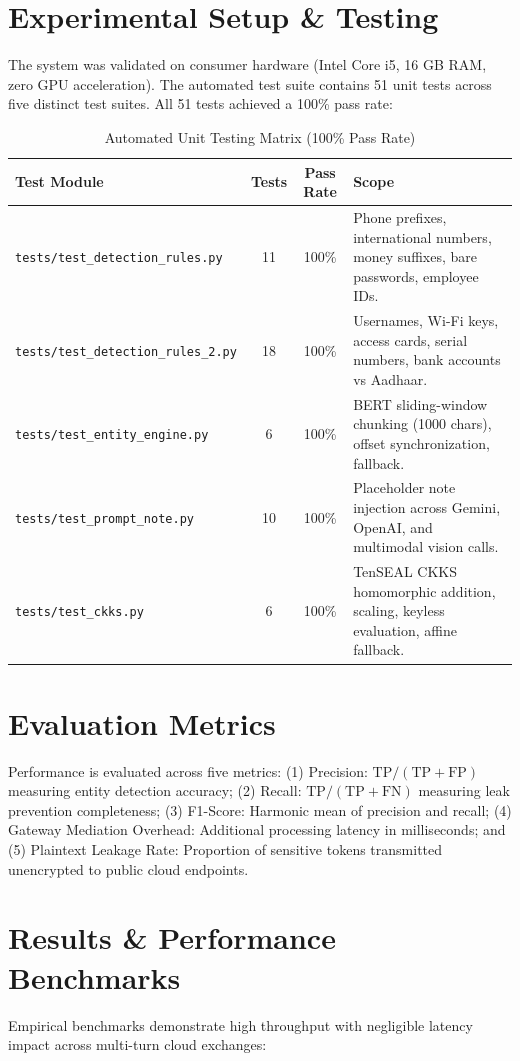 \documentclass[10pt,a4paper]{article}
\begin{document}
\section{Experimental Setup \& Testing}
The system was validated on consumer hardware (Intel Core i5, 16 GB RAM, zero GPU acceleration). The automated test suite contains 51 unit tests across five distinct test suites. All 51 tests achieved a 100\% pass rate:

\begin{table}[h]
\centering
\small
\begin{tabular}{p{}ccp{}}
\toprule
\textbf{Test Module} & \textbf{Tests} & \textbf{Pass Rate} & \textbf{Scope} \\
\midrule
\texttt{tests/test\_detection\_rules.py} & 11 & 100\% & Phone prefixes, international numbers, money suffixes, bare passwords, employee IDs. \\
\texttt{tests/test\_detection\_rules\_2.py} & 18 & 100\% & Usernames, Wi-Fi keys, access cards, serial numbers, bank accounts vs Aadhaar. \\
\texttt{tests/test\_entity\_engine.py} & 6 & 100\% & BERT sliding-window chunking (1000 chars), offset synchronization, fallback. \\
\texttt{tests/test\_prompt\_note.py} & 10 & 100\% & Placeholder note injection across Gemini, OpenAI, and multimodal vision calls. \\
\texttt{tests/test\_ckks.py} & 6 & 100\% & TenSEAL CKKS homomorphic addition, scaling, keyless evaluation, affine fallback. \\
\bottomrule
\end{tabular}
\caption{Automated Unit Testing Matrix (100\% Pass Rate)}
\end{table}

\section{Evaluation Metrics}
Performance is evaluated across five metrics: (1) Precision: $\text{TP}/(\text{TP}+\text{FP})$ measuring entity detection accuracy; (2) Recall: $\text{TP}/(\text{TP}+\text{FN})$ measuring leak prevention completeness; (3) F1-Score: Harmonic mean of precision and recall; (4) Gateway Mediation Overhead: Additional processing latency in milliseconds; and (5) Plaintext Leakage Rate: Proportion of sensitive tokens transmitted unencrypted to public cloud endpoints.

\section{Results \& Performance Benchmarks}
Empirical benchmarks demonstrate high throughput with negligible latency impact across multi-turn cloud exchanges:
\end{document}
